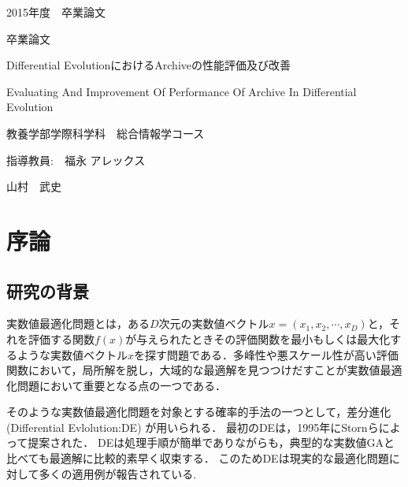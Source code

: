 \documentclass[a4paper,11pt,oneside,openany]{jsbook}
\begin{document}
\thispagestyle{empty}
2015年度　卒業論文%
\bigskip%
\LARGE%
\begin{center}
卒業論文
\end{center}
\bigskip\bigskip\bigskip\bigskip\bigskip\bigskip\bigskip %
\begin{center} %
Differential EvolutionにおけるArchiveの性能評価及び改善
\end{center}
\large %
\begin{center}
Evaluating And Improvement Of Performance Of Archive In Differential Evolution
\end{center}
\bigskip\bigskip\bigskip\bigskip\bigskip\bigskip\bigskip\bigskip\bigskip\bigskip
\bigskip\bigskip\bigskip\bigskip\bigskip\bigskip\bigskip\bigskip\bigskip
\Large %
\begin{center}
教養学部学際科学科　総合情報学コース
\end{center}
\Large %
\begin{center}
指導教員:　福永 アレックス
\end{center}
\LARGE %
\begin{center}
山村　武史
\end{center}
\normalsize
\thispagestyle{empty}
\tableofcontents

\chapter{序論}
\section{研究の背景}
実数値最適化問題とは，ある$D$次元の実数値ベクトル${x} = (x_1, x_2, \cdots, x_D)$と，それを評価する関数$f(x)$が与えられたときその評価関数を最小もしくは最大化するような実数値ベクトル$x$を探す問題である．多峰性や悪スケール性が高い評価関数において，局所解を脱し，大域的な最適解を見つつけだすことが実数値最適化問題において重要となる点の一つである．

そのような実数値最適化問題を対象とする確率的手法の一つとして，差分進化(Differential Evlolution:DE) \cite{Storn} が用いられる．
最初のDEは，1995年にStornらによって提案された．
DEは処理手順が簡単でありながらも，典型的な実数値GAと比べても最適解に比較的素早く収束する．
このためDEは現実的な最適化問題に対して多くの適用例が報告されている. \cite{ExDE} 
\end{document}
